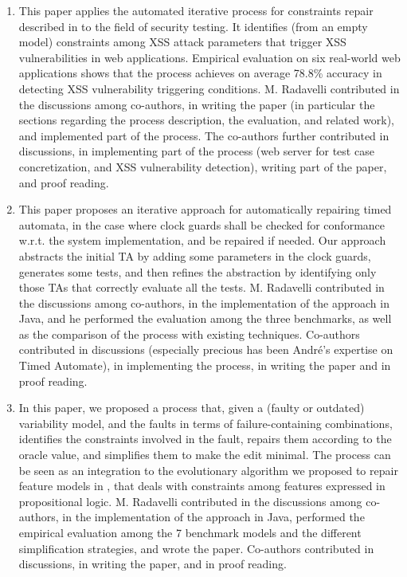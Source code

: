 \begin{enumerate}
	\item \cite{garn2019} 
	
	This paper applies the automated iterative process for constraints repair described in \cite{gargantini_combinatorial_2017} to the field of security testing. It identifies (from an empty model) constraints among XSS attack parameters that trigger XSS vulnerabilities in web applications. Empirical evaluation on six real-world web applications shows that the process achieves on average 78.8\% accuracy in detecting XSS vulnerability triggering conditions.
	M. Radavelli contributed in the discussions among co-authors, in writing the paper (in particular the sections regarding the process description, the evaluation, and related work), and implemented part of the process.%
	The co-authors further contributed in discussions, in implementing part of the process (web server for test case concretization, and XSS vulnerability detection), writing part of the paper, and proof reading.
	
	\item \cite{andre_tap_2019} 

	This paper proposes an iterative approach for automatically repairing timed automata, in the case where clock guards shall be checked for conformance w.r.t. the system implementation, and be repaired if needed. 
	Our approach abstracts the initial TA by adding some parameters in the clock guards, generates some tests, and then refines the abstraction by identifying only those TAs that correctly evaluate all the tests.
	M. Radavelli contributed in the discussions among co-authors, in the implementation of the approach in Java, and he performed the evaluation among the three benchmarks, as well as the comparison of the process with existing techniques.
	Co-authors contributed in discussions (especially precious has been André's expertise on Timed Automate), in implementing the process, in writing the paper and in proof reading.
	
	\item \cite{arcaini2019varivolution} 

	In this paper, we proposed a process that, given a (faulty or outdated) variability model, and the faults in terms of failure-containing combinations, identifies the constraints involved in the fault, repairs them according to the oracle value, and simplifies them to make the edit minimal. 
	The process can be seen as an integration to the evolutionary algorithm we proposed to repair feature models in \cite{arcaini_evolutionary_2018,arcaini2019achieving}, that deals with constraints among features expressed in propositional logic. 
	M. Radavelli contributed in the discussions among co-authors, in the implementation of the approach in Java, performed the empirical evaluation among the 7 benchmark models and the different simplification strategies, and wrote the paper.
	Co-authors contributed in discussions, in writing the paper, and in proof reading.

\end{enumerate}

